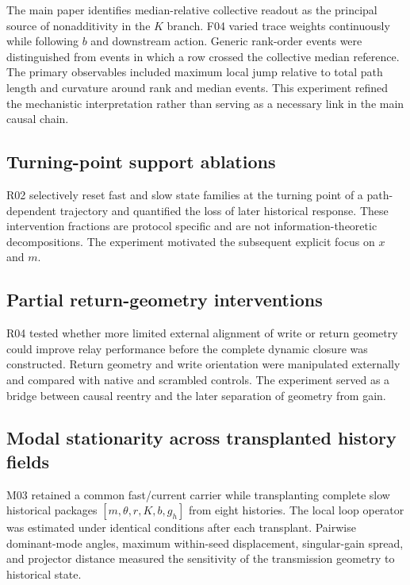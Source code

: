 \documentclass[11pt]{article}
\begin{document}
The main paper identifies median-relative collective readout as the principal source of nonadditivity in the $K$ branch. F04 varied trace weights continuously while following $b$ and downstream action. Generic rank-order events were distinguished from events in which a row crossed the collective median reference. The primary observables included maximum local jump relative to total path length and curvature around rank and median events. This experiment refined the mechanistic interpretation rather than serving as a necessary link in the main causal chain.

\subsection{Turning-point support ablations}

R02 selectively reset fast and slow state families at the turning point of a path-dependent trajectory and quantified the loss of later historical response. These intervention fractions are protocol specific and are not information-theoretic decompositions. The experiment motivated the subsequent explicit focus on $x$ and $m$.

\subsection{Partial return-geometry interventions}

R04 tested whether more limited external alignment of write or return geometry could improve relay performance before the complete dynamic closure was constructed. Return geometry and write orientation were manipulated externally and compared with native and scrambled controls. The experiment served as a bridge between causal reentry and the later separation of geometry from gain.

\subsection{Modal stationarity across transplanted history fields}

M03 retained a common fast/current carrier while transplanting complete slow historical packages $[m,\theta,r,K,b,g_h]$ from eight histories. The local loop operator was estimated under identical conditions after each transplant. Pairwise dominant-mode angles, maximum within-seed displacement, singular-gain spread, and projector distance measured the sensitivity of the transmission geometry to historical state.
\end{document}
